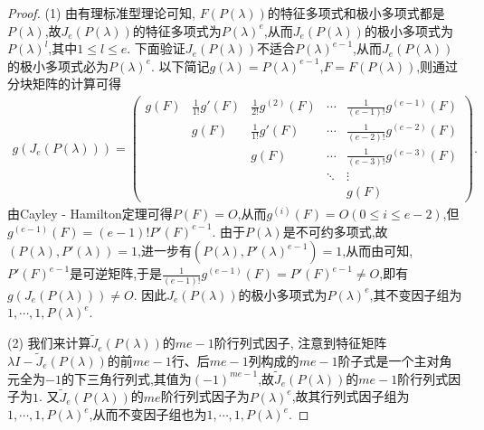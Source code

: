 \documentclass[../../main.tex]{subfiles}
\begin{document}
\begin{proof}
(1) 由有理标准型理论可知, $F(P(\lambda))$的特征多项式和极小多项式都是$P(\lambda)$,故$J_e(P(\lambda))$的特征多项式为$P(\lambda)^e$,从而$J_e(P(\lambda))$的极小多项式为$P(\lambda)^l$,其中$1\leqslant l\leqslant e$. 下面验证$J_e(P(\lambda))$不适合$P(\lambda)^{e - 1}$,从而$J_e(P(\lambda))$的极小多项式必为$P(\lambda)^e$. 以下简记$g(\lambda)=P(\lambda)^{e - 1}$,$F = F(P(\lambda))$,则通过分块矩阵的计算可得
\begin{align*}
g(J_e(P(\lambda))) = 
\begin{pmatrix}
g(F) & \frac{1}{1!}g'(F) & \frac{1}{2!}g^{(2)}(F) & \cdots & \frac{1}{(e - 1)!}g^{(e - 1)}(F) \\
 & g(F) & \frac{1}{1!}g'(F) & \cdots & \frac{1}{(e - 2)!}g^{(e - 2)}(F) \\
 & & g(F) & \cdots & \frac{1}{(e - 3)!}g^{(e - 3)}(F) \\
 & & & \ddots & \vdots \\
 & & & & g(F)
\end{pmatrix}.
\end{align*}
由Cayley - Hamilton定理可得$P(F)=O$,从而$g^{(i)}(F)=O (0\leqslant i\leqslant e - 2)$,但$g^{(e - 1)}(F)=(e - 1)!P'(F)^{e - 1}$. 由于$P(\lambda)$是不可约多项式,故$(P(\lambda),P'(\lambda)) = 1$,进一步有$(P(\lambda),P'(\lambda)^{e - 1}) = 1$,从而由可知,$P'(F)^{e - 1}$是可逆矩阵,于是$\frac{1}{(e - 1)!}g^{(e - 1)}(F)=P'(F)^{e - 1}\neq O$,即有$g(J_e(P(\lambda)))\neq O$. 因此$J_e(P(\lambda))$的极小多项式为$P(\lambda)^e$,其不变因子组为$1,\cdots,1,P(\lambda)^e$.

(2) 我们来计算$\widetilde{J}_e(P(\lambda))$的$me - 1$阶行列式因子, 注意到特征矩阵$\lambda I-\widetilde{J}_e(P(\lambda))$的前$me - 1$行、后$me - 1$列构成的$me - 1$阶子式是一个主对角元全为$-1$的下三角行列式,其值为$(-1)^{me - 1}$,故$\widetilde{J}_e(P(\lambda))$的$me - 1$阶行列式因子为$1$. 又$\widetilde{J}_e(P(\lambda))$的$me$阶行列式因子为$P(\lambda)^e$,故其行列式因子组为$1,\cdots,1,P(\lambda)^e$,从而不变因子组也为$1,\cdots,1,P(\lambda)^e$.

\end{proof}
\end{document}

